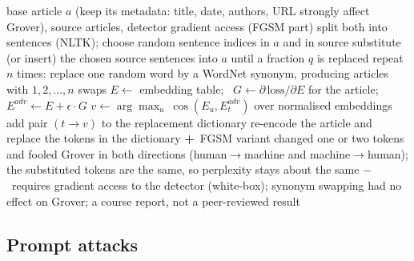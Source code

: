 \documentclass[10pt,a4paper,twocolumn]{article}
\newcommand{\pro}[1]{\Statex\textcolor{proc}{\textbf{+}\ #1}}
\newcommand{\con}[1]{\Statex\textcolor{conc}{\textbf{$-$}\ #1}}
\begin{document}
\begin{algorithm}[H]\small
\caption{Frankenstein, synonym and FGSM-embedding perturbations of Grover (Kulkarni et al.)}
\begin{algorithmic}[1]
\Require base article $a$ (keep its metadata: title, date, authors, URL strongly affect Grover), source articles, detector gradient access (FGSM part)
 \State split both into sentences (NLTK); choose random sentence indices in $a$ and in source
 \State substitute (or insert) the chosen source sentences into $a$ until a fraction $q$ is replaced
\EndProcedure
{} \State repeat $n$ times: replace one random word by a WordNet synonym, producing articles with $1,2,\dots,n$ swaps \EndProcedure
{}
 \State $E\gets$ embedding table; \ $G\gets\partial\,\mathrm{loss}/\partial E$ for the article; \ $E^{adv}\gets E+\epsilon\cdot G$
  \State $v\gets\arg\max_{u}\ \cos(E_u,E^{adv}_t)$ over normalised embeddings
   \State add pair $(t\to v)$ to the replacement dictionary \EndIf
 \EndFor
 \State re-encode the article and replace the tokens in the dictionary
\EndProcedure
\pro{FGSM variant changed one or two tokens and fooled Grover in both directions (human$\to$machine and machine$\to$human); the substituted tokens are the same, so perplexity stays about the same}
\con{requires gradient access to the detector (white-box); synonym swapping had no effect on Grover; a course report, not a peer-reviewed result}
\end{algorithmic}
\end{algorithm}

\subsection*{Prompt attacks}
\end{document}
